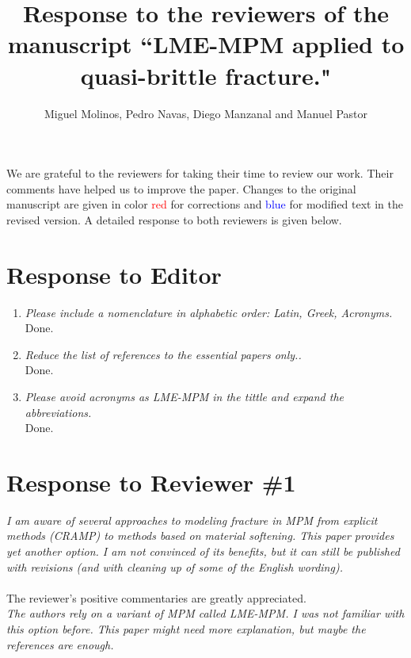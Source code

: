 \documentclass[12pt]{article}
\title{Response to the reviewers of the manuscript ``LME-MPM applied to quasi-brittle fracture."}
\author{Miguel Molinos, Pedro Navas, Diego Manzanal and Manuel Pastor\\}
\date{}
\begin{document}
\maketitle

We are grateful to the reviewers for taking their time  to review our work. Their comments have helped us to improve the paper. Changes to the original manuscript are given in  color \textcolor{red}{red} for corrections and  \textcolor{blue}{blue} for modified text in the revised version.  A detailed response to both reviewers is given below.

\section*{Response to Editor}

 \begin{enumerate}

\item \textit{Please include a nomenclature in alphabetic order: Latin, Greek, Acronyms.}\\

Done.
 
\item \textit{Reduce the list of references to the essential papers only..}\\

Done.
  
\item \textit{Please avoid acronyms as LME-MPM in the tittle and expand the abbreviations.}\\

Done.

 \end{enumerate}

\section*{Response to Reviewer \#1}
{\it
I am aware of several approaches to modeling fracture in MPM from explicit methods (CRAMP) to methods based on material softening. This paper provides yet another option. I am not convinced of its benefits, but it can still be published with revisions (and with cleaning up of some of the English wording).
}
\\
\\
The reviewer's positive commentaries are greatly appreciated.
\\

\textit{The authors rely on a variant of MPM called LME-MPM. I was not familiar with this option before. This paper might need more explanation, but maybe the references are enough.}\\
\end{document}

